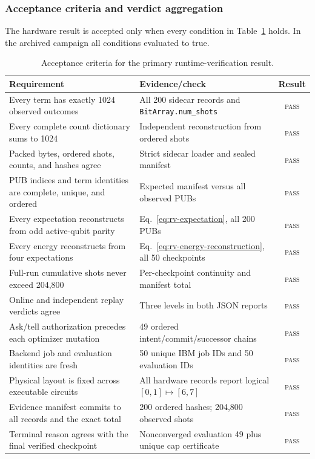 \subsubsection{Acceptance criteria and verdict aggregation}

The hardware result is accepted only when every condition in
Table~\ref{tab:rv-acceptance} holds.  In the archived campaign all conditions
evaluated to true.

\begin{table}[t]
  \centering
  \caption{Acceptance criteria for the primary runtime-verification result.}
  \label{tab:rv-acceptance}
  \renewcommand{\arraystretch}{1.1}
  \begin{tabular}{p{}p{}c}
    \toprule
    Requirement & Evidence/check & Result \\
    \midrule
    Every term has exactly 1024 observed outcomes
      & All 200 sidecar records and \texttt{BitArray.num\_shots} & \textsc{pass} \\
    Every complete count dictionary sums to 1024
      & Independent reconstruction from ordered shots & \textsc{pass} \\
    Packed bytes, ordered shots, counts, and hashes agree
      & Strict sidecar loader and sealed manifest & \textsc{pass} \\
    PUB indices and term identities are complete, unique, and ordered
      & Expected manifest versus all observed PUBs & \textsc{pass} \\
    Every expectation reconstructs from odd active-qubit parity
      & Eq.~\eqref{eq:rv-expectation}, all 200 PUBs & \textsc{pass} \\
    Every energy reconstructs from four expectations
      & Eq.~\eqref{eq:rv-energy-reconstruction}, all 50 checkpoints & \textsc{pass} \\
    Full-run cumulative shots never exceed 204,800
      & Per-checkpoint continuity and manifest total & \textsc{pass} \\
    Online and independent replay verdicts agree
      & Three levels in both JSON reports & \textsc{pass} \\
    Ask/tell authorization precedes each optimizer mutation
      & 49 ordered intent/commit/successor chains & \textsc{pass} \\
    Backend job and evaluation identities are fresh
      & 50 unique IBM job IDs and 50 evaluation IDs & \textsc{pass} \\
    Physical layout is fixed across executable circuits
      & All hardware records report logical $[0,1]\mapsto[6,7]$ & \textsc{pass} \\
    Evidence manifest commits to all records and the exact total
      & 200 ordered hashes; 204,800 observed shots & \textsc{pass} \\
    Terminal reason agrees with the final verified checkpoint
      & Nonconverged evaluation 49 plus unique cap certificate & \textsc{pass} \\
    \bottomrule
  \end{tabular}
\end{table}

